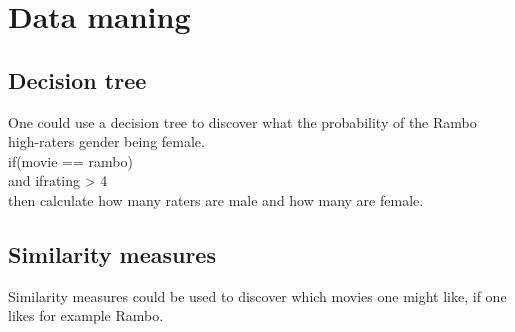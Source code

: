 \section{Data maning}
\subsection{Decision tree}
One could use a decision tree to discover what the probability of the Rambo
high-raters gender being female.\\
if(movie == rambo)\\
and if{rating > 4}\\
then calculate how many raters are male and how many are female.\\

\subsection{Similarity measures}
Similarity measures could be used to discover which movies one might like, if
one likes for example Rambo.\\
